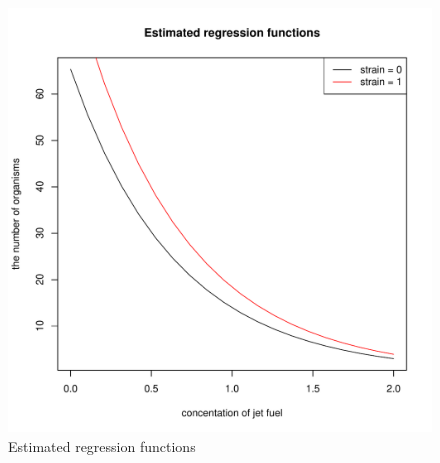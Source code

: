 \documentclass[]{article}
\begin{document}
\begin{enumerate}
{\begin{figure}
	\centering
	\includegraphics[width = \textwidth]{pic/HW2_4/est_func}
	\caption{Estimated regression functions}
	\label{est_func}
\end{figure}
}

\end{enumerate} 


\begin{thebibliography}{99}
\end{thebibliography}
\end{document}
